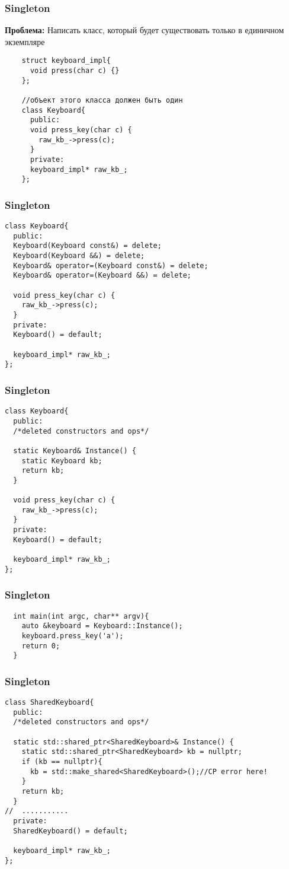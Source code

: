 \begin{frame}[fragile]
  \frametitle{Singleton}
  \textbf{Проблема:} Написать класс, который будет существовать только в единичном экземпляре
  \begin{verbatim}
    struct keyboard_impl{
      void press(char c) {}
    };
    
    //объект этого класса должен быть один
    class Keyboard{ 
      public:
      void press_key(char c) {
        raw_kb_->press(c);
      }
      private:
      keyboard_impl* raw_kb_;
    };
  \end{verbatim}
\end{frame}

\begin{frame}[fragile]
  \frametitle{Singleton}
  \begin{verbatim}
class Keyboard{
  public:
  Keyboard(Keyboard const&) = delete;
  Keyboard(Keyboard &&) = delete;
  Keyboard& operator=(Keyboard const&) = delete;
  Keyboard& operator=(Keyboard &&) = delete;
  
  void press_key(char c) {
    raw_kb_->press(c);
  }
  private:
  Keyboard() = default;
  
  keyboard_impl* raw_kb_;
};
  \end{verbatim}
\end{frame}

\begin{frame}[fragile]
  \frametitle{Singleton}
  \begin{verbatim}
class Keyboard{
  public:
  /*deleted constructors and ops*/
  
  static Keyboard& Instance() {
    static Keyboard kb;
    return kb;
  }
  
  void press_key(char c) {
    raw_kb_->press(c);
  }
  private:
  Keyboard() = default;
  
  keyboard_impl* raw_kb_;
};
  \end{verbatim}
\end{frame}

\begin{frame}[fragile]
  \frametitle{Singleton}
  \begin{verbatim}
  int main(int argc, char** argv){
    auto &keyboard = Keyboard::Instance();
    keyboard.press_key('a');
    return 0;
  }
  \end{verbatim}
\end{frame}

\begin{frame}[fragile]
  \frametitle{Singleton}
  \begin{verbatim}
class SharedKeyboard{
  public:
  /*deleted constructors and ops*/
  
  static std::shared_ptr<SharedKeyboard>& Instance() {
    static std::shared_ptr<SharedKeyboard> kb = nullptr;
    if (kb == nullptr){
      kb = std::make_shared<SharedKeyboard>();//CP error here!
    }
    return kb;
  }
//  ...........
  private:
  SharedKeyboard() = default;
  
  keyboard_impl* raw_kb_;
};
  \end{verbatim}
\end{frame}

